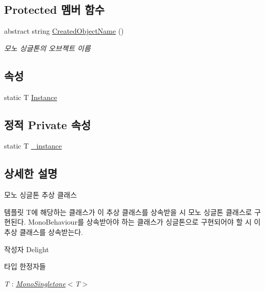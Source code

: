 \subsection*{Protected 멤버 함수}
\begin{DoxyCompactItemize}
\item 
abstract string \hyperlink{class_m_c_n_1_1_mono_singletone_a3dde6c2c7e6a3723102f059a043aed22}{Created\+Object\+Name} ()
\begin{DoxyCompactList}\small\item\em 모노 싱글톤의 오브젝트 이름 \end{DoxyCompactList}\end{DoxyCompactItemize}
\subsection*{속성}
\begin{DoxyCompactItemize}
\item 
static T \hyperlink{class_m_c_n_1_1_mono_singletone_aa50c027cca64cf4ad30c1ee5c83e0b78}{Instance}
\end{DoxyCompactItemize}
\subsection*{정적 Private 속성}
\begin{DoxyCompactItemize}
\item 
static T \hyperlink{class_m_c_n_1_1_mono_singletone_a790a4dfd828c6e4f008ad64d33d61ac0}{\+\_\+instance}
\end{DoxyCompactItemize}


\subsection{상세한 설명}
모노 싱글톤 추상 클래스 

템플릿 T에 해당하는 클래스가 이 추상 클래스를 상속받을 시 모노 싱글톤 클래스로 구현된다. Mono\+Behaviour를 상속받아야 하는 클래스가 싱글톤으로 구현되어야 할 시 이 추상 클래스를 상속받는다. \begin{DoxyAuthor}{작성자}
Delight 
\end{DoxyAuthor}
\begin{Desc}
\item[타입 한정자들]\begin{description}
\item[{\em T} : {\em \hyperlink{class_m_c_n_1_1_mono_singletone}{Mono\+Singletone}$<$T$>$}]\end{description}
\end{Desc}


